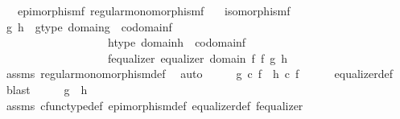 \begin{isabellebody}
\ \ \ {\isachardoublequoteopen}epimorphism{\isacharparenleft}{\kern0pt}f{\isacharparenright}{\kern0pt}{\isachardoublequoteclose}\ {\isachardoublequoteopen}regular{\isacharunderscore}{\kern0pt}monomorphism{\isacharparenleft}{\kern0pt}f{\isacharparenright}{\kern0pt}{\isachardoublequoteclose}\isanewline
\ \ \ {\isachardoublequoteopen}isomorphism{\isacharparenleft}{\kern0pt}f{\isacharparenright}{\kern0pt}{\isachardoublequoteclose}\isanewline
%
\isadelimproof
%
\endisadelimproof
%
\isatagproof
{}\isamarkupfalse%
\ {\isacharminus}{\kern0pt}\isanewline
\ \ \isamarkupfalse%
\ g\ h\ \ g{\isacharunderscore}{\kern0pt}type{\isacharcolon}{\kern0pt}\ {\isachardoublequoteopen}domain{\isacharparenleft}{\kern0pt}g{\isacharparenright}{\kern0pt}\ {\isacharequal}{\kern0pt}\ codomain{\isacharparenleft}{\kern0pt}f{\isacharparenright}{\kern0pt}{\isachardoublequoteclose}\ \isanewline
\ \ \ \ \ \ \ \ \ \ \ \ \ \ \ \ \ \ \ h{\isacharunderscore}{\kern0pt}type{\isacharcolon}{\kern0pt}\ {\isachardoublequoteopen}domain{\isacharparenleft}{\kern0pt}h{\isacharparenright}{\kern0pt}\ {\isacharequal}{\kern0pt}\ codomain{\isacharparenleft}{\kern0pt}f{\isacharparenright}{\kern0pt}{\isachardoublequoteclose}\ \isanewline
\ \ \ \ \ \ \ \ \ \ \ \ \ \ \ \ \ \ \ f{\isacharunderscore}{\kern0pt}equalizer{\isacharcolon}{\kern0pt}\ {\isachardoublequoteopen}equalizer\ {\isacharparenleft}{\kern0pt}domain\ f{\isacharparenright}{\kern0pt}\ f\ g\ h{\isachardoublequoteclose}\isanewline
\ \ \ \ \isamarkupfalse%
\ assms{\isacharparenleft}{\kern0pt}{}{\isacharparenright}{\kern0pt}\ regular{\isacharunderscore}{\kern0pt}monomorphism{\isacharunderscore}{\kern0pt}def\ \isamarkupfalse%
\ auto\isanewline
\ \ \isamarkupfalse%
\ \isamarkupfalse%
\ {\isachardoublequoteopen}g\ {\isasymcirc}\isactrlsub c\ f\ {\isacharequal}{\kern0pt}\ h\ {\isasymcirc}\isactrlsub c\ f{\isachardoublequoteclose}\isanewline
\ \ \ \ \isamarkupfalse%
\ equalizer{\isacharunderscore}{\kern0pt}def\ \isamarkupfalse%
\ blast\isanewline
\ \ \isamarkupfalse%
\ \isamarkupfalse%
\ {\isachardoublequoteopen}g\ {\isacharequal}{\kern0pt}\ h{\isachardoublequoteclose}\isanewline
\ \ \ \ \isamarkupfalse%
\ assms{\isacharparenleft}{\kern0pt}{}{\isacharparenright}{\kern0pt}\ cfunc{\isacharunderscore}{\kern0pt}type{\isacharunderscore}{\kern0pt}def\ epimorphism{\isacharunderscore}{\kern0pt}def\ equalizer{\isacharunderscore}{\kern0pt}def\ f{\isacharunderscore}{\kern0pt}equalizer\ \isamarkupfalse%

\end{isabellebody}
